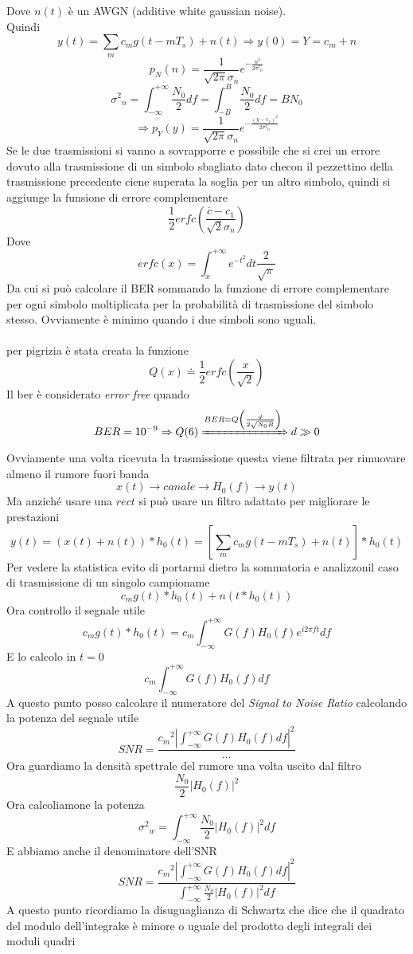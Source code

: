 \documentclass{article}
\newcommand{\accapo}{\\\hspace*{1cm}\\}
\newcommand{\intfity}{\int_{-\infty}^{+\infty}}
\begin{document}
Dove \(n(t)\) è un AWGN (additive white gaussian noise).\\
Quindi 
\[y(t)=\sum_{m}c_m g(t-m T_s)+n(t)\Rightarrow y(0)=Y=c_m+n\]
\[p_N(n)=\frac{1}{\sqrt{2\pi}\sigma_n}e^{-\frac{n^2}{2{\sigma^2}_n}}\]
\[{\sigma^2}_n=\intfity\frac{N_0}{2}df=\int_{-B}^B\frac{N_0}{2}df=B N_0\]
\[\Rightarrow p_Y(y)=\frac{1}{\sqrt{2\pi}\sigma_n}e^{-\frac{{(y-c_1)}^2}{2{\sigma^2}_n}}\]
Se le due trasmissioni si vanno a sovrapporre e possibile che si crei un errore dovuto alla trasmissione di un simbolo sbagliato dato checon il pezzettino della trasmissione precedente ciene superata la soglia per un altro simbolo, quindi si aggiunge la funsione di errore complementare
\[\frac{1}{2}erfc\left(\frac{\overline{c}-c_1}{\sqrt{2}\sigma_n}\right)\]
Dove
\[erfc(x)=\int_{x}^{+\infty}e^{-t^2}dt\frac{2}{\sqrt{\pi}}\]
Da cui si può calcolare il BER sommando la funzione di errore complementare per ogni simbolo moltiplicata per la probabilità di trasmissione del simbolo stesso. Ovviamente è minimo quando i due simboli sono uguali.
\accapo 
per pigrizia è stata creata la funzione
\[Q(x)\doteq\frac{1}{2}erfc\left(\frac{x}{\sqrt{2}}\right)\]
Il ber è considerato \textit{error free} quando
\[BER=10^{-9}\Rightarrow Q(6)\xRightarrow{BER=Q\left(\frac{d}{2\sqrt{N_0 B}}\right)}d\gg 0\]
Ovviamente una volta ricevuta la trasmissione questa viene filtrata per rimuovare almeno il rumore fuori banda
\[x(t)\to\boxed{canale}\to\boxed{H_0(f)}\to y(t)\]
Ma anziché usare una \(rect\) si può usare un filtro adattato per migliorare le prestazioni
\[y(t)=(x(t)+n(t))*h_0(t)=\left[\sum_m c_m g(t-mT_s)+n(t)\right]*h_0(t)\]
Per vedere la statistica evito di portarmi dietro la sommatoria e analizzonil caso di trasmissione di un singolo campioname 
\[c_m g(t)*h_0(t)+n(t*h_0(t))\]
Ora controllo il segnale utile
\[c_m g(t)*h_0(t)=c_m\intfity G(f)H_0(f)e^{i2\pi ft}df\]
E lo calcolo in \(t=0\)
\[c_m\intfity G(f)H_0(f)df\]
A questo punto posso calcolare il numeratore del \textit{Signal to Noise Ratio} calcolando la potenza del segnale utile
\[SNR=\frac{{c_m}^2\left|\intfity G(f)H_0(f)df\right|^2}{\cdots}\]
Ora guardiamo la densità spettrale del rumore una volta uscito dal filtro
\[\frac{N_0}{2}{|H_0(f)|}^2\]
Ora calcoliamone la potenza
\[{\sigma^2}_w=\intfity\frac{N_0}{2}{|H_0(f)|}^2df\]
E abbiamo anche il denominatore dell'SNR
\[SNR=\frac{{c_m}^2\left|\intfity G(f)H_0(f)df\right|^2}{\intfity\frac{N_0}{2}{|H_0(f)|}^2df}\]
A questo punto ricordiamo la disuguaglianza di Schwartz che dice che il quadrato del modulo dell'integrake è minore o uguale del prodotto degli integrali dei moduli quadri
\end{document}
